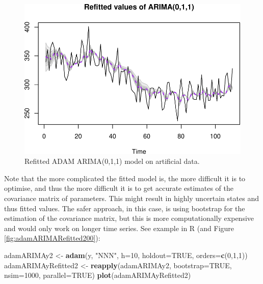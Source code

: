 \documentclass[]{book}
\newenvironment{Shaded}{\begin{snugshade}}{\end{snugshade}}
\newcommand{\DataTypeTok}[1]{\textcolor[rgb]{0.13,0.29,0.53}{#1}}
\newcommand{\DecValTok}[1]{\textcolor[rgb]{0.00,0.00,0.81}{#1}}
\newcommand{\KeywordTok}[1]{\textcolor[rgb]{0.13,0.29,0.53}{\textbf{#1}}}
\newcommand{\NormalTok}[1]{#1}
\newcommand{\OtherTok}[1]{\textcolor[rgb]{0.56,0.35,0.01}{#1}}
\newcommand{\StringTok}[1]{\textcolor[rgb]{0.31,0.60,0.02}{#1}}
\theoremstyle{definition}
\theoremstyle{definition}
\theoremstyle{definition}
\theoremstyle{definition}
\theoremstyle{remark}
\begin{document}
\begin{figure}
\centering
\includegraphics{Svetunkov--2022----ADAM_files/figure-latex/adamARIMARefitted-1.pdf}
\caption{\label{fig:adamARIMARefitted}Refitted ADAM ARIMA(0,1,1) model on artificial data.}
\end{figure}

Note that the more complicated the fitted model is, the more difficult it is to optimise, and thus the more difficult it is to get accurate estimates of the covariance matrix of parameters. This might result in highly uncertain states and thus fitted values. The safer approach, in this case, is using bootstrap for the estimation of the covariance matrix, but this is more computationally expensive and would only work on longer time series. See example in R (and Figure \ref{fig:adamARIMARefitted200}):

\begin{Shaded}
\begin{Highlighting}[]
\NormalTok{adamARIMAy2 <-}\StringTok{ }\KeywordTok{adam}\NormalTok{(y, }\StringTok{"NNN"}\NormalTok{, }\DataTypeTok{h=}\DecValTok{10}\NormalTok{, }\DataTypeTok{holdout=}\OtherTok{TRUE}\NormalTok{,}
                    \DataTypeTok{orders=}\KeywordTok{c}\NormalTok{(}\DecValTok{0}\NormalTok{,}\DecValTok{1}\NormalTok{,}\DecValTok{1}\NormalTok{))}
\NormalTok{adamARIMAyRefitted2 <-}\StringTok{ }\KeywordTok{reapply}\NormalTok{(adamARIMAy2, }\DataTypeTok{bootstrap=}\OtherTok{TRUE}\NormalTok{,}
                               \DataTypeTok{nsim=}\DecValTok{1000}\NormalTok{, }\DataTypeTok{parallel=}\OtherTok{TRUE}\NormalTok{)}
\KeywordTok{plot}\NormalTok{(adamARIMAyRefitted2)}
\end{Highlighting}
\end{Shaded}
\end{document}
